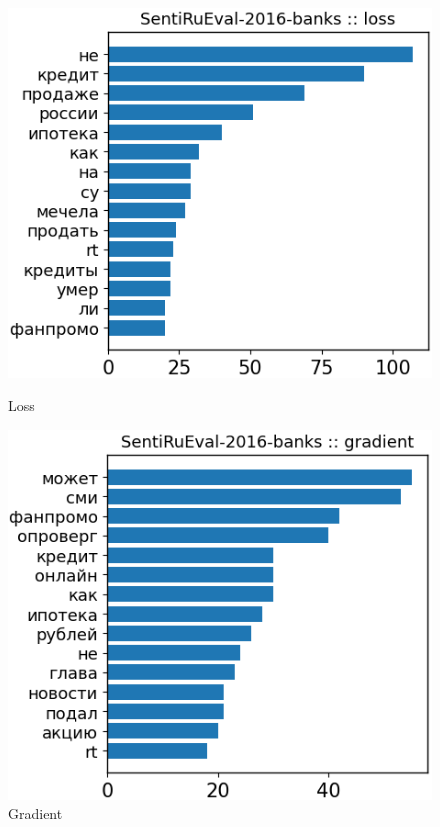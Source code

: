 \begin{figure}[H]
\centering
\begin{minipage}[b]{0.49\textwidth}
\centering
\includegraphics[width=\textwidth]{pictures/examples_banks/dict5.png} %
\caption{Loss}
\end{minipage}
\hfill
\begin{minipage}[b]{0.49\textwidth}
\centering
\includegraphics[width=\textwidth]{pictures/examples_banks/dict6.png} %
\caption{Gradient}
\end{minipage}
\end{figure}

